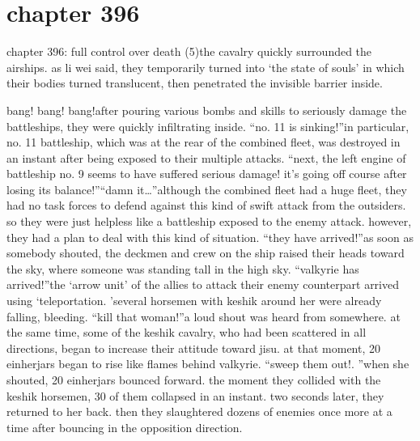 \section{chapter 396}

chapter 396: full control over death (5)the cavalry quickly surrounded the airships.
 as li wei said, they temporarily turned into ‘the state of souls’ in which their bodies turned translucent, then penetrated the invisible barrier inside.





bang! bang! bang!after pouring various bombs and skills to seriously damage the battleships, they were quickly infiltrating inside.
“no.
 11 is sinking!”in particular, no.
 11 battleship, which was at the rear of the combined fleet, was destroyed in an instant after being exposed to their multiple attacks.
“next, the left engine of battleship no.
 9 seems to have suffered serious damage! it’s going off course after losing its balance!”“damn it…”although the combined fleet had a huge fleet, they had no task forces to defend against this kind of swift attack from the outsiders.
 so they were just helpless like a battleship exposed to the enemy attack.
however, they had a plan to deal with this kind of situation.
“they have arrived!”as soon as somebody shouted, the deckmen and crew on the ship raised their heads toward the sky, where someone was standing tall in the high sky.
“valkyrie has arrived!”the ‘arrow unit’ of the allies to attack their enemy counterpart arrived using ‘teleportation.
’several horsemen with keshik around her were already falling, bleeding.
“kill that woman!”a loud shout was heard from somewhere.
 at the same time, some of the keshik cavalry, who had been scattered in all directions, began to increase their attitude toward jisu.
at that moment, 20 einherjars began to rise like flames behind valkyrie.
“sweep them out!.
”when she shouted, 20 einherjars bounced forward.
the moment they collided with the keshik horsemen, 30 of them collapsed in an instant.
 two seconds later, they returned to her back.
then they slaughtered dozens of enemies once more at a time after bouncing in the opposition direction.


